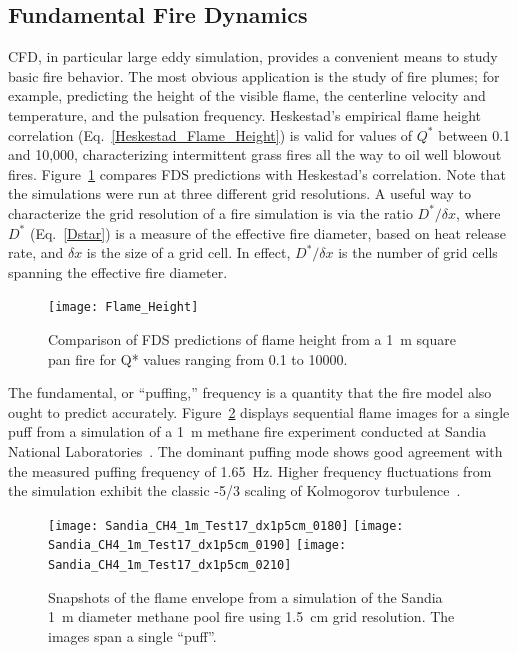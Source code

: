 \documentclass[graybox]{svmult}
\begin{document}
\subsection{Fundamental Fire Dynamics}

CFD, in particular large eddy simulation, provides a convenient means to study basic fire behavior. The most obvious application is the study of fire plumes; for example, predicting the height of the visible flame, the centerline velocity and temperature, and the pulsation frequency. Heskestad's empirical flame height correlation (Eq.~\ref{Heskestad_Flame_Height}) is valid for values of  $Q^*$ between 0.1 and 10,000, characterizing intermittent grass fires all the way to oil well blowout fires. Figure~\ref{Flame_Height} compares FDS predictions with Heskestad's correlation. Note that the simulations were run at three different grid resolutions. A useful way to characterize the grid resolution of a fire simulation is via the ratio $D^*/\delta x$, where $D^*$ (Eq.~\ref{Dstar}) is a measure of the effective fire diameter, based on heat release rate, and $\delta x$ is the size of a grid cell. In effect, $D^*/\delta x$ is the number of grid cells spanning the effective fire diameter.
\begin{figure}[ht]
\begin{center}
\texttt{[image: Flame\_Height]}
\end{center}
\caption{Comparison of FDS predictions of flame height from a 1~m square pan fire for Q* values ranging from
0.1 to 10000.}
\label{Flame_Height}
\end{figure}

The fundamental, or ``puffing,'' frequency is a quantity that the fire model also ought to predict accurately. Figure~\ref{Sandia_Simulation} displays sequential flame images for a single puff from a simulation of a 1~m methane fire experiment conducted at Sandia National Laboratories~\cite{Tieszen:2002}. The dominant puffing mode shows good agreement with the measured puffing frequency of 1.65~Hz. Higher frequency fluctuations from the simulation exhibit the classic -5/3 scaling of Kolmogorov turbulence~\cite{Pope:2000}.
\begin{figure}[t]
\begin{center}
\texttt{[image: Sandia\_CH4\_1m\_Test17\_dx1p5cm\_0180]}
\texttt{[image: Sandia\_CH4\_1m\_Test17\_dx1p5cm\_0190]}
\texttt{[image: Sandia\_CH4\_1m\_Test17\_dx1p5cm\_0210]}
\end{center}
\caption{Snapshots of the flame envelope from a simulation of the Sandia 1~m diameter methane pool fire using 1.5~cm grid resolution.  The images span a single ``puff''.}
\label{Sandia_Simulation}
\end{figure}
\end{document}
